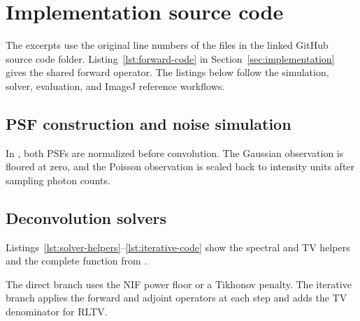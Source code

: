 \clearpage
{}
\setlength{\headwidth}{\textwidth}
\section{Implementation source code}
\label{app:code}

The excerpts use the original line numbers of the files in the linked GitHub source code folder. Listing~\ref{lst:forward-code} in Section~\ref{sec:implementation} gives the shared forward operator. The listings below follow the simulation, solver, evaluation, and ImageJ reference workflows.

\subsection{PSF construction and noise simulation}

In , both PSFs are normalized before convolution. The Gaussian observation is floored at zero, and the Poisson observation is scaled back to intensity units after sampling photon counts.



\clearpage
\subsection{Deconvolution solvers}

Listings~\ref{lst:solver-helpers}--\ref{lst:iterative-code} show the spectral and TV helpers and the complete  function from .



\clearpage
The direct branch uses the NIF power floor or a Tikhonov penalty. The iterative branch applies the forward and adjoint operators at each step and adds the TV denominator for RLTV.

